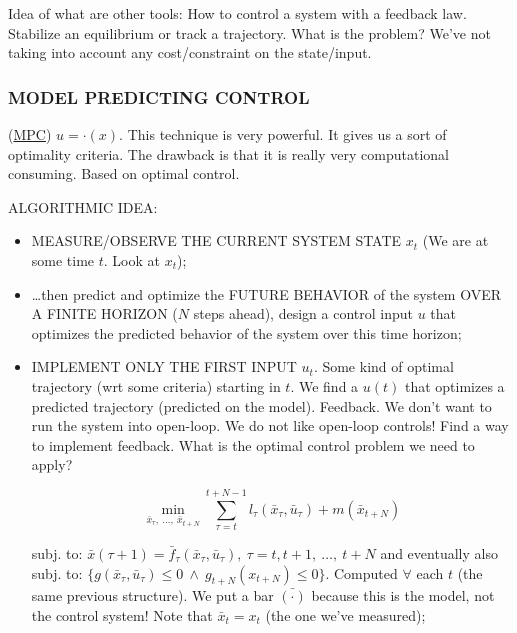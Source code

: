 Idea of what are other tools: How to control a system with a feedback law. Stabilize an equilibrium or track a trajectory. What is the problem? We've not taking into account any cost/constraint on the state/input.

\subsubsection{MODEL PREDICTING CONTROL}

(\underline{MPC}) $u = \mathord{\cdot}(x)$. This technique is very powerful. It gives us a sort of optimality criteria. The drawback is that it is really very computational consuming. Based on optimal control.

ALGORITHMIC IDEA:
\begin{itemize}
\item{MEASURE/OBSERVE THE CURRENT SYSTEM STATE} $x_t$ (We are at some time $t$. Look at $x_t$);
\item \dots then predict and optimize the FUTURE BEHAVIOR of the system OVER A FINITE HORIZON ($N$ steps ahead), design a control input $u$ that optimizes the predicted behavior of the system over this time horizon;
\item{IMPLEMENT ONLY THE FIRST INPUT} $u_t$. Some kind of optimal trajectory (wrt some criteria) starting in $t$. We find a $u(t)$ that optimizes a predicted trajectory (predicted on the model). Feedback. We don't want to run the system into open-loop. We do not like open-loop controls! Find a way to implement feedback. What is the optimal control problem we need to apply?

\[
	\min_{\bar{x}_\tau,\ \dots,\ \bar{x}_{t+N}}{\sum_{\tau=t}^{t+N-1}{l_\tau(\bar{x}_\tau,\bar{u}_\tau)} + m(\bar{x}_{t+N})}
\]

subj. to: $\bar{x}(\tau+1) = \bar{f}_\tau(\bar{x}_\tau,\bar{u}_\tau),\ \tau=t,t+1,\ \dots,\ t+N$ and eventually also subj. to: $\{g(\bar{x}_\tau,\bar{u}_\tau)\leq 0\ \land\ g_{t+N}(x_{t+N})\leq 0\}$. Computed $\forall$ each $t$ (the same previous structure). We put a bar $\bar{(\mathord{\cdot})}$ because this is the model, not the control system! Note that $\bar{x}_t = x_t$ (the one we've measured);
\end{itemize}

